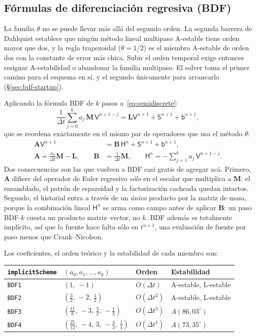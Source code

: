 \documentclass[11pt,a4paper]{article}
\newcommand{\code}[1]{\texttt{\small #1}}
\newcommand{\Mmass}{\mathbf{M}}
\newcommand{\Lop}{\mathbf{L}}
\newcommand{\Aimp}{\mathbf{A}}
\newcommand{\Bimp}{\mathbf{B}}
\begin{document}
\subsection{Fórmulas de diferenciación regresiva (BDF)}
\label{sec:bdf}

La familia $\theta$ no se puede llevar más allá del segundo orden. La segunda barrera de
Dahlquist establece que ningún método lineal multipaso A-estable tiene orden mayor que dos,
y la regla trapezoidal ($\theta=1/2$) es el miembro A-estable de orden dos con la constante
de error más chica. Subir el orden temporal exige entonces resignar A-estabilidad o
abandonar la familia multipaso. El solver toma el primer camino para el esquema en sí, y el
segundo únicamente para arrancarlo (\S\ref{sec:bdf-startup}).

Aplicando la fórmula BDF de $k$ pasos a~\eqref{eq:semidiscrete}:
\begin{equation}
  \frac{1}{\Delta t}\sum_{j=0}^{k} a_j\,\Mmass\,\mathsf{V}^{n+1-j}
  =
  \Lop\mathsf{V}^{n+1}+\mathsf{S}^{n+1}+\mathsf{b}^{n+1},
  \label{eq:bdf}
\end{equation}
que se reordena exactamente en el mismo par de operadores que usa el método $\theta$:
\begin{align}
  \Aimp \mathsf{V}^{n+1}
  &=
  \Bimp\,\mathsf{H}^{n}+\mathsf{S}^{n+1}+\mathsf{b}^{n+1},
  \label{eq:bdf-system}\\
  \Aimp = \frac{a_0}{\Delta t}\Mmass-\Lop,
  \qquad
  \Bimp &= \frac{1}{\Delta t}\Mmass,
  \qquad
  \mathsf{H}^{n} = -\sum_{j=1}^{k} a_j\,\mathsf{V}^{n+1-j}.
\end{align}
Dos consecuencias son las que vuelven a BDF casi gratis de agregar acá. Primero, $\Aimp$
difiere del operador de Euler regresivo \emph{sólo} en el escalar que multiplica a
$\Mmass$: el ensamblado, el patrón de esparsidad y la factorización cacheada quedan
intactos. Segundo, el historial entra a través de un \emph{único} producto por la matriz de
masa, porque la combinación lineal $\mathsf{H}^n$ se arma como campo antes de aplicar
$\Bimp$: un paso BDF-$k$ cuesta un producto matriz--vector, no $k$. BDF además es totalmente
implícito, así que la fuente hace falta sólo en $t^{n+1}$, una evaluación de fuente por paso
menos que Crank--Nicolson.

Los coeficientes, el orden teórico y la estabilidad de cada miembro son:
\begin{center}
\begin{tabular}{@{}llll@{}}
\toprule
\code{implicitScheme} & $(a_0,a_1,\dots,a_k)$ & Orden & Estabilidad \\
\midrule
\code{BDF1} & $(1,\,-1)$ & $O(\Delta t)$ & A-estable, L-estable \\
\code{BDF2} & $(\tfrac32,\,-2,\,\tfrac12)$ & $O(\Delta t^2)$ & A-estable, L-estable \\
\code{BDF3} & $(\tfrac{11}{6},\,-3,\,\tfrac32,\,-\tfrac13)$ & $O(\Delta t^3)$ & $A(86{,}03^\circ)$ \\
\code{BDF4} & $(\tfrac{25}{12},\,-4,\,3,\,-\tfrac43,\,\tfrac14)$ & $O(\Delta t^4)$ & $A(73{,}35^\circ)$ \\
\bottomrule
\end{tabular}
\end{center}
\end{document}
